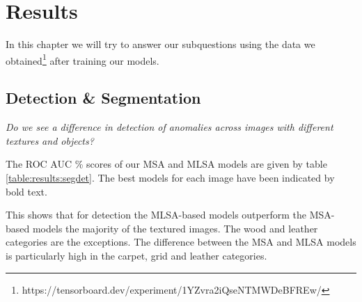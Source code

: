 \chapter{Results}\label{ch:results}

In this chapter we will try to answer our subquestions using the data we obtained\footnote{https://tensorboard.dev/experiment/1YZvra2iQseNTMWDeBFREw/} after training our models.

\section{Detection \& Segmentation}
\label{sec:results:det-seg}

\textit{Do we see a difference in detection of anomalies across images with different textures and objects?}

The ROC AUC \% scores of our MSA and MLSA models are given by table \ref{table:results:segdet}. The best models for each image have been indicated by bold text.

This shows that for detection the MLSA-based models outperform the MSA-based models the majority of the textured images. The wood and leather categories are the exceptions. The difference between the MSA and MLSA models is particularly high in the carpet, grid and leather categories.

